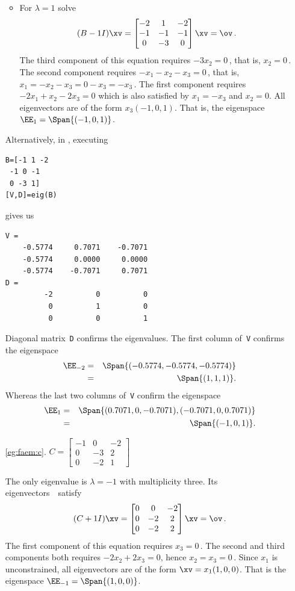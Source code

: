 \begin{example}
\begin{itemize}
\begin{solution}
\begin{itemize}
\item For \(\lambda=1\) solve
\begin{equation*}
(B-1I)\xv=\begin{bmatrix}-2&1&-2
\\-1&-1&-1
\\0&-3&0 \end{bmatrix}\xv=\ov\,.
\end{equation*}
The third component of this equation requires \(-3x_2=0\)\,, that is, \(x_2=0\)\,.
The second component requires \(-x_1-x_2-x_3=0\)\,, that is, \(x_1=-x_2-x_3=0-x_3=-x_3\)\,.
The first component requires \(-2x_1+x_2-2x_3=0\) which is also satisfied by \(x_1=-x_3\) and \(x_2=0\).
All eigenvectors are of the form \(x_3(-1,0,1)\).
That is, the eigenspace \(\EE_{1}=\Span\{(-1,0,1)\}\).
\end{itemize}

Alternatively, in \script, executing 
\begin{verbatim}
B=[-1 1 -2
 -1 0 -1
 0 -3 1]
[V,D]=eig(B)
\end{verbatim}
gives us
\begin{verbatim}
V =
    -0.5774     0.7071    -0.7071
    -0.5774     0.0000     0.0000
    -0.5774    -0.7071     0.7071
D =
         -2          0          0
          0          1          0
          0          0          1
\end{verbatim}
Diagonal matrix~\verb|D| confirms the eigenvalues. 
The first column of~\verb|V| confirms the eigenspace 
\begin{eqnarray*}
\EE_{-2}&=&\Span\{(-0.5774,-0.5774,-0.5774)\}
\\&=&\Span\{(1,1,1)\}.
\end{eqnarray*}
Whereas the last two columns of~\verb|V| confirm the eigenspace 
\begin{eqnarray*}
\EE_1&=&\Span\{(0.7071,0,-0.7071),(-0.7071,0,0.7071)\}
\\&=&\Span\{(-1,0,1)\}.
\end{eqnarray*}
\end{solution}

\item[\ref{eg:faem:c}.]
\(C=\begin{bmatrix}-1&0&-2
\\0&-3&2
\\0&-2&1\end{bmatrix}\)
\begin{solution} 
The only eigenvalue is \(\lambda=-1\) with multiplicity three.
Its eigenvectors~\xv\ satisfy
\begin{equation*}
(C+1 I)\xv=\begin{bmatrix} 0&0&-2
\\0&-2&2
\\0&-2&2 \end{bmatrix}\xv=\ov\,.
\end{equation*}
The first component of this equation requires \(x_3=0\)\,.  
The second and third components both requires \(-2x_2+2x_3=0\), hence \(x_2=x_3=0\)\,.
Since \(x_1\) is unconstrained, all eigenvectors are of the form \(\xv=x_1(1,0,0)\).  
That is the eigenspace  \(\EE_{-1}=\Span\{(1,0,0)\}\).


\end{solution}
\end{itemize}
\end{example}
